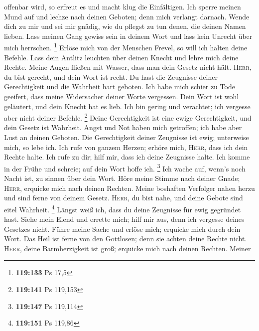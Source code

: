 offenbar wird, so erfreut es und macht klug die Einfältigen.
 Ich sperre meinen Mund auf und lechze nach deinen
Geboten; denn mich verlangt darnach.  Wende dich zu mir
und sei mir gnädig, wie du pflegst zu tun denen, die deinen Namen
lieben.  Lass meinen Gang gewiss sein in deinem Wort und
lass kein Unrecht über mich herrschen. \footnote{\textbf{119:133} Ps
  17,5}  Erlöse mich von der Menschen Frevel, so will
ich halten deine Befehle.  Lass dein Antlitz leuchten
über deinen Knecht und lehre mich deine Rechte.  Meine
Augen fließen mit Wasser, dass man dein Gesetz nicht hält.
 \textsc{Herr}, du bist gerecht, und dein Wort ist
recht.  Du hast die Zeugnisse deiner Gerechtigkeit und
die Wahrheit hart geboten.  Ich habe mich schier zu Tode
geeifert, dass meine Widersacher deiner Worte vergessen.
 Dein Wort ist wohl geläutert, und dein Knecht hat es
lieb.  Ich bin gering und verachtet; ich vergesse aber
nicht deiner Befehle. \footnote{\textbf{119:141} Ps 119,153}
 Deine Gerechtigkeit ist eine ewige Gerechtigkeit, und
dein Gesetz ist Wahrheit.  Angst und Not haben mich
getroffen; ich habe aber Lust an deinen Geboten.  Die
Gerechtigkeit deiner Zeugnisse ist ewig; unterweise mich, so lebe ich.
 Ich rufe von ganzem Herzen; erhöre mich, \textsc{Herr},
dass ich dein Rechte halte.  Ich rufe zu dir; hilf mir,
dass ich deine Zeugnisse halte.  Ich komme in der Frühe
und schreie; auf dein Wort hoffe ich. \footnote{\textbf{119:147} Ps
  119,114}  Ich wache auf, wenn's noch Nacht ist, zu
sinnen über dein Wort.  Höre meine Stimme nach deiner
Gnade; \textsc{Herr}, erquicke mich nach deinen Rechten.
 Meine boshaften Verfolger nahen herzu und sind ferne
von deinem Gesetz.  \textsc{Herr}, du bist nahe, und
deine Gebote sind eitel Wahrheit. \footnote{\textbf{119:151} Ps 119,86}
 Längst weiß ich, dass du deine Zeugnisse für ewig
gegründet hast.  Siehe mein Elend und errette mich; hilf
mir aus, denn ich vergesse deines Gesetzes nicht.  Führe
meine Sache und erlöse mich; erquicke mich durch dein Wort.
 Das Heil ist ferne von den Gottlosen; denn sie achten
deine Rechte nicht.  \textsc{Herr}, deine Barmherzigkeit
ist groß; erquicke mich nach deinen Rechten.  Meiner
